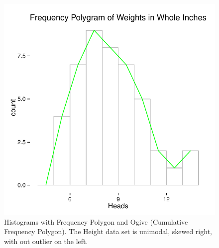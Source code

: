 \documentclass[nohyper,justified]{tufte-handout}\usepackage[]{graphicx}\usepackage[]{color}
\makeatletter
\def\maxwidth{ %
  \ifdim\Gin@nat@width>\linewidth
    \linewidth
  \else
    \Gin@nat@width
  \fi
}
\newenvironment{knitrout}{}{} %
\makeatother
\begin{document}
\begin{knitrout}
\begin{figure}
{\centering \includegraphics[width=\maxwidth]{figure/graphics-histogram-2} 

}

\caption[Histograms with Frequency Polygon and Ogive (Cumulative Frequency Polygon)]{Histograms with Frequency Polygon and Ogive (Cumulative Frequency Polygon). The Height data set is unimodal, skewed right, with out outlier on the left. }\label{fig:histogram2}
\end{figure}


\end{knitrout}
\end{document}
